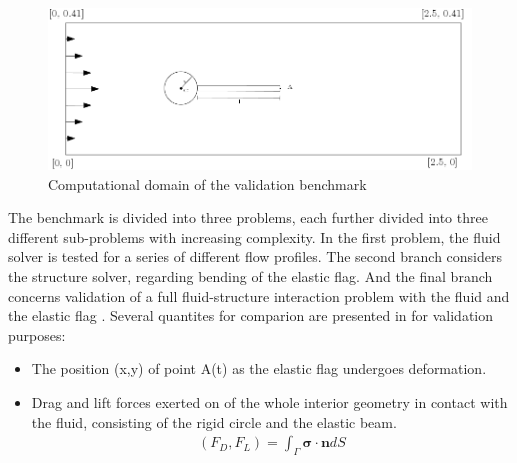 \begin{figure}[h!]
  \centering
    \includegraphics[scale=0.2]{./Fig/turekflag.png}
      \caption{Computational domain of the validation benchmark}
      \label{fig:tflag}
\end{figure}

The benchmark is divided into three problems, each further divided into three different sub-problems with increasing complexity. In the first problem, the fluid solver is tested for a series of different flow profiles. The second branch considers the structure solver, regarding bending of the elastic flag. And the final branch concerns validation of a full fluid-structure interaction problem with the fluid and the elastic flag .  Several quantites for comparion are presented in \cite{Hron2006} for validation purposes:

\begin{itemize}
\item The position (x,y) of point A(t) as the elastic flag undergoes deformation.
\item Drag and lift forces exerted on of the whole interior geometry in contact with the fluid, consisting of the rigid circle and the elastic beam.
\begin{align*}
(F_D, F_L) = \int_{\Gamma} \mathbf{\sigma} \cdot \mathbf{n} dS
\end{align*}
\end{itemize}

